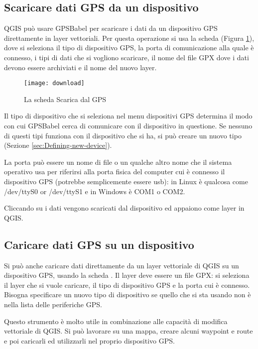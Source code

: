 \subsection{Scaricare dati GPS da un dispositivo}

QGIS può usare GPSBabel per scaricare i dati da un dispositivo GPS direttamente in layer vettoriali.
Per questa operazione si usa la scheda  (Figura \ref{figure_download}), 
dove si seleziona il tipo di dispositivo GPS, la porta di comunicazione alla quale è connesso, 
i tipi di dati che si vogliono scaricare, il nome del file GPX dove i dati devono essere archiviati e 
il nome del nuovo layer.

\begin{figure}[ht]
   \centering
   \texttt{[image: download]}
   \caption{La scheda Scarica dal GPS \nixcaption}\label{figure_download}
\end{figure}

Il tipo di dispositivo che si seleziona nel menu dispositivi GPS determina il modo con cui GPSBabel 
cerca di comunicare con il dispositivo in questione. Se nessuno di questi tipi funziona con il 
dispositivo che si ha, si può creare un nuovo tipo (Sezione \ref{sec:Defining-new-device}).

La porta può essere un nome di file o un qualche altro nome che il sistema operativo usa per riferirsi 
alla porta fisica del computer cui è connesso il dispositivo GPS (potrebbe semplicemente essere usb): 
\nix in Linux è qualcosa come /dev/ttyS0 or /dev/ttyS1 e in \win Windows è COM1 o COM2.

Cliccando su  i dati vengono scaricati dal dispositivo ed appaiono come layer in QGIS.

\subsection{Caricare dati GPS su un dispositivo}

Si può anche caricare dati direttamente da un layer vettoriale di QGIS su un dispositivo GPS, 
usando la scheda . Il layer deve essere un file GPX: si seleziona il layer che si 
vuole caricare, il tipo di dispositivo GPS e la porta cui è connesso.
Bisogna specificare un nuovo tipo di dispositivo se quello che si sta usando non è nella lista delle 
periferiche GPS.

Questo strumento è molto utile in combinazione alle capacità di modifica vettoriale di QGIS.
Si può lavorare su una mappa, creare alcuni waypoint e route e poi caricarli ed utilizzarli nel proprio 
dispositivo GPS.

